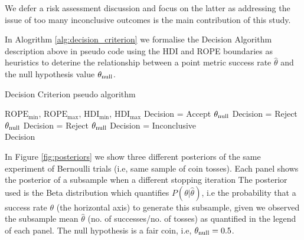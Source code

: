 We defer a risk assessment discussion and focus on the latter as
addressing the issue of too many inconclusive outcomes is the main contribution of this study.


In Alogrithm \ref{alg:decision_criterion} we formalise the Decision Algorithm description
above in pseudo code using the HDI and ROPE boundaries as heuristics to deterine the relationship between a point metric success rate $\hat{\theta}$ and the null hypothesis value $\theta_{\rm null}$.

\begin{algorithm}
    \caption{Decision Criterion pseudo algorithm}\label{alg:decision_criterion}
    \begin{algorithmic}
    \Require $\mathrm{ROPE}_\mathrm{min}$, $\mathrm{ROPE}_\mathrm{max}$, $\mathrm{HDI}_\mathrm{min}$, $\mathrm{HDI}_\mathrm{max}$
        \State Decision = Accept $\theta_{\rm null}$ 
        \State Decision = Reject $\theta_{\rm null}$ 
        \State Decision = Reject $\theta_{\rm null}$ 
    \Else
    \State Decision = Inconclusive  
    \EndIf \\
    \Return Decision
    \end{algorithmic} 
    
\end{algorithm}

In Figure \ref{fig:posteriors} we show three different posteriors of the same experiment of Bernoulli
trials (i.e, same sample of coin tosses). %
Each panel shows the posterior of a subsample when a different stopping iteration
The posterior used is the Beta distribution which quantifies $P(\theta|\hat{\theta})$,
i.e the probability that a
success rate $\theta$ (the horizontal axis) to generate this subsample,
given we observed the subsample mean $\hat\theta$ (no. of successes/no. of tosses)
as quantified in the legend of each panel. The null hypothesis is a fair coin, i.e, $\theta_{\rm null}=0.5$.

